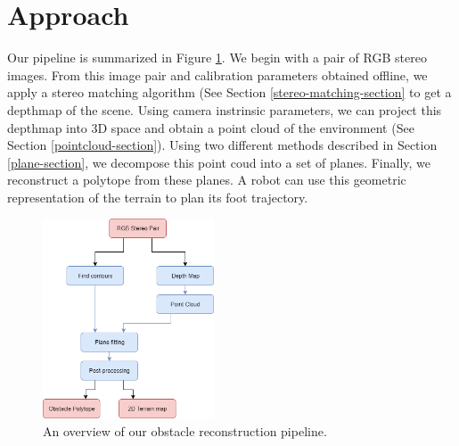 \section{Approach}

Our pipeline is summarized in Figure \ref{overview-diagram}. We begin with a pair of RGB stereo images. From this image pair and calibration parameters obtained offline, we apply a stereo matching algorithm (See Section \ref{stereo-matching-section} to get a depthmap of the scene. Using camera instrinsic parameters, we can project this depthmap into 3D space and obtain a point cloud of the environment (See Section \ref{pointcloud-section}). Using two different methods described in Section \ref{plane-section}, we decompose this point coud into a set of planes. Finally, we reconstruct a polytope from these planes. A robot can use this geometric representation of the terrain to plan its foot trajectory.


\begin{figure}[!h]
\centering
\includegraphics[width=2in]{Sections/Figures/Final-Project-Pipeline.png}
\caption{An overview of our obstacle reconstruction pipeline.}
\label{overview-diagram}
\end{figure}

